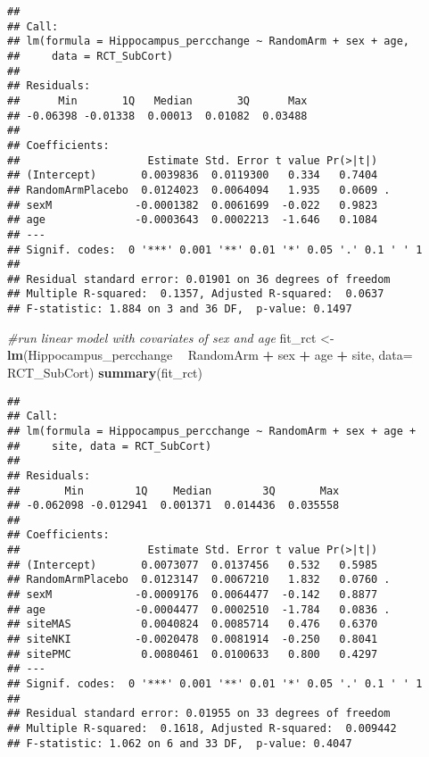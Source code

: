 \documentclass[]{article}
\newenvironment{Shaded}{\begin{snugshade}}{\end{snugshade}}
\newcommand{\KeywordTok}[1]{\textcolor[rgb]{0.13,0.29,0.53}{\textbf{#1}}}
\newcommand{\DataTypeTok}[1]{\textcolor[rgb]{0.13,0.29,0.53}{#1}}
\newcommand{\StringTok}[1]{\textcolor[rgb]{0.31,0.60,0.02}{#1}}
\newcommand{\CommentTok}[1]{\textcolor[rgb]{0.56,0.35,0.01}{\textit{#1}}}
\newcommand{\OperatorTok}[1]{\textcolor[rgb]{0.81,0.36,0.00}{\textbf{#1}}}
\newcommand{\NormalTok}[1]{#1}
\theoremstyle{definition}
\theoremstyle{definition}
\theoremstyle{definition}
\theoremstyle{remark}
\begin{document}
\begin{verbatim}
## 
## Call:
## lm(formula = Hippocampus_percchange ~ RandomArm + sex + age, 
##     data = RCT_SubCort)
## 
## Residuals:
##      Min       1Q   Median       3Q      Max 
## -0.06398 -0.01338  0.00013  0.01082  0.03488 
## 
## Coefficients:
##                    Estimate Std. Error t value Pr(>|t|)  
## (Intercept)       0.0039836  0.0119300   0.334   0.7404  
## RandomArmPlacebo  0.0124023  0.0064094   1.935   0.0609 .
## sexM             -0.0001382  0.0061699  -0.022   0.9823  
## age              -0.0003643  0.0002213  -1.646   0.1084  
## ---
## Signif. codes:  0 '***' 0.001 '**' 0.01 '*' 0.05 '.' 0.1 ' ' 1
## 
## Residual standard error: 0.01901 on 36 degrees of freedom
## Multiple R-squared:  0.1357, Adjusted R-squared:  0.0637 
## F-statistic: 1.884 on 3 and 36 DF,  p-value: 0.1497
\end{verbatim}

\begin{Shaded}
\begin{Highlighting}[]
\CommentTok{#run linear model with covariates of sex and age}
\NormalTok{  fit_rct <-}\StringTok{ }\KeywordTok{lm}\NormalTok{(Hippocampus_percchange }\OperatorTok{~}\StringTok{ }\NormalTok{RandomArm }\OperatorTok{+}\StringTok{ }\NormalTok{sex }\OperatorTok{+}\StringTok{ }\NormalTok{age }\OperatorTok{+}\StringTok{ }\NormalTok{site, }\DataTypeTok{data=}\NormalTok{ RCT_SubCort)}
  \KeywordTok{summary}\NormalTok{(fit_rct)}
\end{Highlighting}
\end{Shaded}

\begin{verbatim}
## 
## Call:
## lm(formula = Hippocampus_percchange ~ RandomArm + sex + age + 
##     site, data = RCT_SubCort)
## 
## Residuals:
##       Min        1Q    Median        3Q       Max 
## -0.062098 -0.012941  0.001371  0.014436  0.035558 
## 
## Coefficients:
##                    Estimate Std. Error t value Pr(>|t|)  
## (Intercept)       0.0073077  0.0137456   0.532   0.5985  
## RandomArmPlacebo  0.0123147  0.0067210   1.832   0.0760 .
## sexM             -0.0009176  0.0064477  -0.142   0.8877  
## age              -0.0004477  0.0002510  -1.784   0.0836 .
## siteMAS           0.0040824  0.0085714   0.476   0.6370  
## siteNKI          -0.0020478  0.0081914  -0.250   0.8041  
## sitePMC           0.0080461  0.0100633   0.800   0.4297  
## ---
## Signif. codes:  0 '***' 0.001 '**' 0.01 '*' 0.05 '.' 0.1 ' ' 1
## 
## Residual standard error: 0.01955 on 33 degrees of freedom
## Multiple R-squared:  0.1618, Adjusted R-squared:  0.009442 
## F-statistic: 1.062 on 6 and 33 DF,  p-value: 0.4047
\end{verbatim}
\end{document}
